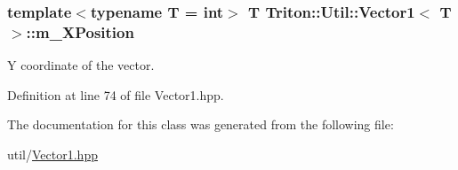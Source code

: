 \subsubsection[{m\+\_\+\+X\+Position}]{\setlength{\rightskip}{0pt plus 5cm}template$<$typename T = int$>$ T {\bf Triton\+::\+Util\+::\+Vector1}$<$ T $>$\+::m\+\_\+\+X\+Position}\label{class_triton_1_1_util_1_1_vector1_a379cb608c766a1eed8f730fcff9dff9c}


Y coordinate of the vector. 



Definition at line 74 of file Vector1.\+hpp.



The documentation for this class was generated from the following file\+:\begin{DoxyCompactItemize}
\item 
util/\hyperlink{_vector1_8hpp}{Vector1.\+hpp}\end{DoxyCompactItemize}
